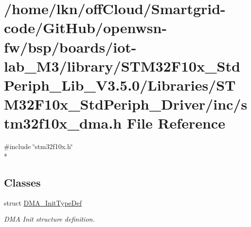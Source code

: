 \hypertarget{iot-lab___m3_2library_2_s_t_m32_f10x___std_periph___lib___v3_85_80_2_libraries_2_s_t_m32_f10x___652ee8a81058e9c37833a6a811b3c258}{}\section{/home/lkn/off\+Cloud/\+Smartgrid-\/code/\+Git\+Hub/openwsn-\/fw/bsp/boards/iot-\/lab\+\_\+\+M3/library/\+S\+T\+M32\+F10x\+\_\+\+Std\+Periph\+\_\+\+Lib\+\_\+\+V3.5.0/\+Libraries/\+S\+T\+M32\+F10x\+\_\+\+Std\+Periph\+\_\+\+Driver/inc/stm32f10x\+\_\+dma.h File Reference}
\label{iot-lab___m3_2library_2_s_t_m32_f10x___std_periph___lib___v3_85_80_2_libraries_2_s_t_m32_f10x___652ee8a81058e9c37833a6a811b3c258}
{\ttfamily \#include \char`\"{}stm32f10x.\+h\char`\"{}}\\*
\subsection*{Classes}
\begin{DoxyCompactItemize}
\item 
struct \hyperlink{struct_d_m_a___init_type_def}{D\+M\+A\+\_\+\+Init\+Type\+Def}
\begin{DoxyCompactList}\small\item\em D\+MA Init structure definition. \end{DoxyCompactList}\end{DoxyCompactItemize}

